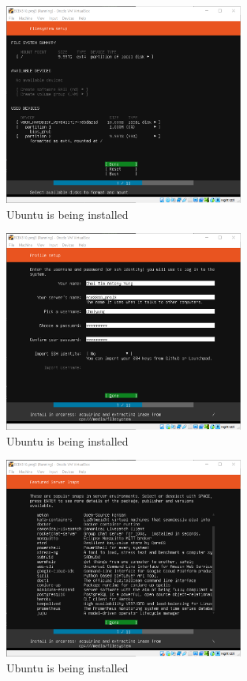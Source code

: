 \documentclass{article}
\begin{document}
\begin{figure}[H]
  \caption{Ubuntu is being installed}
  \centering
  \includegraphics[width=0.7\textwidth]{ECE4310_Proj3_1_installing_7_3.png}
\end{figure}

\begin{figure}[H]
  \caption{Ubuntu is being installed}
  \centering
  \includegraphics[width=0.7\textwidth]{ECE4310_Proj3_1_installing_7_4.png}
\end{figure}

\begin{figure}[H]
  \caption{Ubuntu is being installed}
  \centering
  \includegraphics[width=0.7\textwidth]{ECE4310_Proj3_1_installing_7_5.png}
\end{figure}
\end{document}
